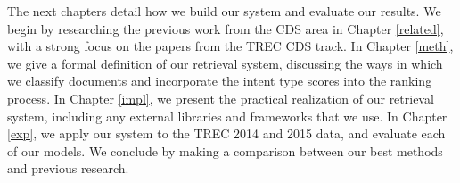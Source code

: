 The next chapters detail how we build our system and evaluate our results.
We begin by researching the previous work from the CDS area in Chapter \ref{related},
with a strong focus on the papers from the TREC CDS track.
In Chapter \ref{meth}, we give a formal definition of our retrieval system, discussing the ways in which we classify documents
and incorporate the intent type scores into the ranking process.
In Chapter \ref{impl}, we present the practical realization of our retrieval system, including any external libraries
and frameworks that we use.
In Chapter \ref{exp}, we apply our system to the TREC 2014 and 2015 data, and evaluate each of our models.
We conclude by making a comparison between our best methods and previous research.







